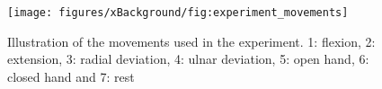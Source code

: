 \begin{figure}[H]                 
	\texttt{[image: figures/xBackground/fig:experiment\_movements]}  
	\caption{Illustration of the movements used in the experiment. 1: flexion, 2: extension, 3: radial deviation, 4: ulnar deviation, 5: open hand, 6: closed hand and 7: rest}
	\label{fig:experiment_movements} 
\end{figure}
%
%
